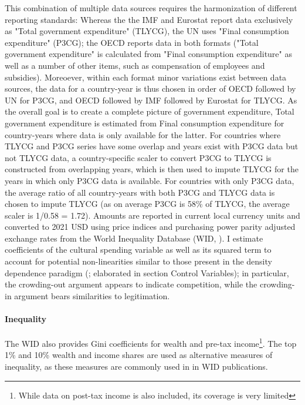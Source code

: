 \documentclass[11pt]{article}
\begin{document}
This combination of multiple data sources requires the harmonization of different reporting standards: 
Whereas the the IMF and Eurostat report data exclusively as "Total government expenditure" (TLYCG), the UN uses "Final consumption expenditure" (P3CG); the OECD reports data in both formats ("Total government expenditure" is calculated from "Final consumption expenditure" as well as a number of other items, such as compensation of employees and subsidies). 
Moreoever, within each format minor variations exist between data sources, the data for a country-year is thus chosen in order of OECD followed by UN for P3CG, and OECD followed by IMF followed by Eurostat for TLYCG.
As the overall goal is to create a complete picture of government expenditure, Total government expenditure is estimated from Final consumption expenditure for country-years where data is only available for the latter.
For countries where TLYCG and P3CG series have some overlap and years exist with P3CG data but not TLYCG data, a country-specific scaler to convert P3CG to TLYCG is constructed from overlapping years, which is then used to impute TLYCG for the years in which only P3CG data is available.
For countries with only P3CG data, the average ratio of all country-years with both P3CG and TLYCG data is chosen to impute TLYCG (as on average P3CG is 58\% of TLYCG, the average scaler is 1/0.58 = 1.72). 
Amounts are reported in current local currency units and converted to 2021 USD using price indices and purchasing power parity adjusted exchange rates from the World Inequality Database (WID,  \citeyear{WID_2021_WID}).
I estimate coefficients of the cultural spending variable as well as its squared term to account for potential non-linearities similar to those present in the density dependence paradigm (\cite{Hannan_1992_dynamics};  elaborated in section Control Variables); in particular, the crowding-out argument appears to indicate competition, while the crowding-in argument bears similarities to legitimation. 



\paragraph*{Inequality}

The WID also provides Gini coefficients for wealth and pre-tax income\footnote{While data on post-tax income is also included, its coverage is very limited}.
The top 1\% and 10\% wealth and income shares are used as alternative measures of inequality, as these measures are commonly used in in WID publications.
\end{document}
